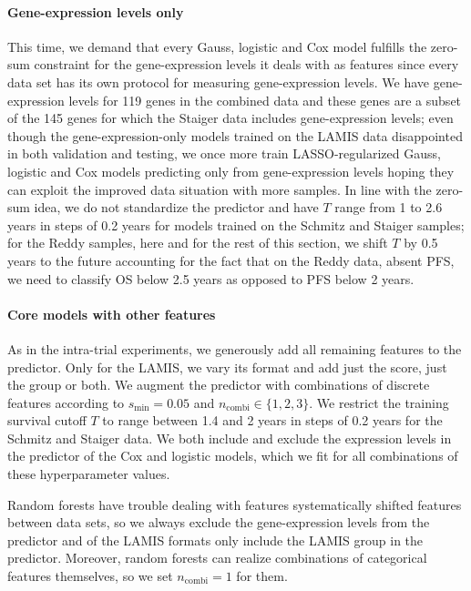 \paragraph{Gene-expression levels only}
This time, we demand that every Gauss, logistic and Cox model fulfills the zero-sum constraint for 
the gene-expression levels it deals with as features since every data set has its own protocol for 
measuring gene-expression levels. We have gene-expression levels for \num{119} genes in the 
combined data and these genes are a subset of the \num{145} genes for which the Staiger data 
includes gene-expression levels; even though the gene-expression-only models trained on the LAMIS 
data disappointed in both validation and testing, we once more train LASSO-regularized Gauss, 
logistic and Cox models predicting only from gene-expression levels hoping they can exploit the 
improved data situation with more samples. In line with the zero-sum idea, we do not standardize 
the predictor and have $T$ range from \num{1} to \num{2.6} years in steps of \num{0.2} years for 
models trained on the Schmitz and Staiger samples; for the Reddy samples, here and for the rest 
of this section, we shift $T$ by
\num{0.5} years to the future accounting for the fact that on the Reddy data, absent PFS, we need 
to classify OS below \num{2.5} years as opposed to PFS below \num{2} years.

\paragraph{Core models with other features}
As in the intra-trial experiments, we generously add all remaining features to the predictor. Only 
for the LAMIS, we vary its format and add just the score, just the group or both. We augment the 
predictor with combinations of discrete features according to $s_\text{min} = \num{0.05}$ and 
$n_\text{combi} \in \{ 1, 2, 3 \}$. We restrict the training survival cutoff $T$ to range between 
\num{1.4} and \num{2} years in steps of \num{0.2} years for the Schmitz and Staiger data. We 
both include and exclude the expression levels in the predictor of the Cox and logistic 
models, which we fit for all combinations of these hyperparameter values.

Random forests have trouble dealing with features systematically shifted features between data sets, so 
we always exclude the gene-expression levels from the predictor and of the LAMIS formats only 
include the LAMIS group in the predictor. Moreover, random forests can realize combinations of 
categorical features themselves, so we set $n_\text{combi} = 1$ for them.

